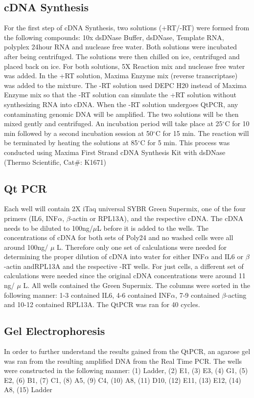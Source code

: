 \documentclass[journal, a4paper]{IEEEtran}
\begin{document}
    \subsection{cDNA Synthesis}
      For the first step of cDNA Synthesis, two solutions (+RT/-RT) were formed from the following compounds:
      10x dsDNase Buffer, dsDNase, Template RNA, polyplex 24hour RNA and nuclease free water.
      Both solutions were incubated after being centrifuged. The solutions were then chilled on ice, centrifuged and placed back on ice.
      For both solutions, 5X Reaction mix and nuclease free water was added. In the +RT solution, Maxima Enzyme mix (reverse transcriptase) was added to the mixture.
      The -RT solution used DEPC H20 instead of Maxima Enzyme mix so that the -RT solution can simulate the +RT solution without synthesizing RNA into cDNA.
      When the -RT solution undergoes QtPCR, any contaminating genomic DNA will be amplified.
      The two solutions will be then mixed gently and centrifuged. An incubation period will take place at 25$^{\circ}$C for 10 min
      followed by a second incubation session at 50$^{\circ}$C for 15 min.
      The reaction will be terminated by heating the solutions at 85$^{\circ}$C for 5 min.
      This process was conducted using Maxima First Strand cDNA Synthesis Kit with dsDNase (Thermo Scientific, Cat#: K1671)

    \subsection{Qt PCR}
      Each well will contain 2X iTaq universal SYBR Green Supermix,
      one of the four primers (IL6, INF$\alpha$, $\beta$-actin or RPL13A),
      and the respective cDNA.
      The cDNA needs to be diluted to 100ng/$\mu$L before it is added to the wells.
      The concentrations of cDNA for both sets of Poly24 and no washed cells were all around 100ng/ $\mu$ L.
      Therefore only one set of calculations were needed for determining the proper dilution of cDNA into water
      for either INF$\alpha$ and IL6 or $\beta$-actin andRPL13A and the respective -RT wells. For just cells,
      a different set of calculations were needed since the original cDNA concentrations were around 11 ng/ $\mu$ L.
      All wells contained the Green Supermix. The columns were sorted in the following manner:
      1-3 contained IL6, 4-6 contained INF$\alpha$, 7-9 contained $\beta$-acting and 10-12 contained RPL13A.
      The QtPCR was ran for 40 cycles.

    \subsection{Gel Electrophoresis}
      In order to further understand the results gained from the QtPCR, an agarose gel was ran
      from the resulting amplified DNA from the Real Time PCR.
      The wells were constructed in the following manner:
      (1) Ladder, (2) E1, (3) E3, (4) G1, (5) E2, (6) B1, (7) C1,
      (8) A5, (9) C4, (10) A8, (11) D10, (12) E11, (13) E12, (14) A8, (15) Ladder
\end{document}
